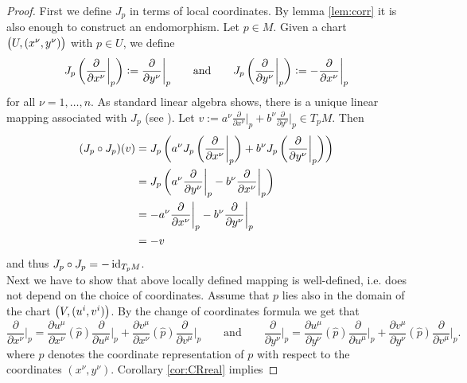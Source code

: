 \begin{proof}
First we define $J_p$ in terms of local coordinates. By lemma \ref{lem:corr} it is also enough to construct an endomorphism. Let $p \in M$. Given a chart $\del[1]{U,(x^\nu,y^\nu)}$ with $p \in U$, we define
\begin{equation*}
J_p\del[3]{\frac{\partial}{\partial x^\nu}\bigg\vert_p} := \frac{\partial}{\partial y^\nu}\bigg\vert_p \qquad \text{and} \qquad J_p\del[3]{\frac{\partial}{\partial y^\nu}\bigg\vert_p} := -\frac{\partial}{\partial x^\nu}\bigg\vert_p
\end{equation*}
\noindent for all $\nu = 1,\dots,n$. As standard linear algebra shows, there is a unique linear mapping associated with $J_p$ (see \cite[69]{hoffman:linear_algebra:1971}). Let $v := a^\nu\frac{\partial}{\partial x^\nu}\big\vert_p + b^\nu\frac{\partial}{\partial y^\nu}\big\vert_p \in T_p M$. Then
\begin{align*}
(J_p \circ J_p)(v) &=J_p\del[3]{a^\nu J_p\del[3]{\frac{\partial}{\partial x^\nu}\bigg\vert_p} + b^\nu J_p\del[3]{\frac{\partial}{\partial y^\nu}\bigg\vert_p}}\\
&= J_p\del[3]{a^\nu \frac{\partial}{\partial y^\nu}\bigg\vert_p - b^\nu \frac{\partial}{\partial x^\nu}\bigg\vert_p}\\
&= -a^\nu \frac{\partial}{\partial x^\nu}\bigg\vert_p - b^\nu \frac{\partial}{\partial y^\nu}\bigg\vert_p\\
&= -v
\end{align*}
\noindent and thus $J_p \circ J_p = -\operatorname{id}_{T_pM}$.\\
Next we have to show that above locally defined mapping is well-defined, i.e. does not depend on the choice of coordinates. Assume that $p$ lies also in the domain of the chart $\del[1]{V,(u^i,v^i)}$. By the change of coordinates formula \cite[64]{lee:smooth_manifolds:2013} we get that
\begin{equation*}
\frac{\partial}{\partial x^\nu}\bigg\vert_p = \frac{\partial u^\mu}{\partial x^\nu}(\widehat{p})\frac{\partial}{\partial u^\mu}\bigg\vert_p + \frac{\partial v^\mu}{\partial x^\nu}(\widehat{p})\frac{\partial}{\partial v^\mu}\bigg\vert_p \qquad \text{and} \qquad \frac{\partial}{\partial y^\nu}\bigg\vert_p = \frac{\partial u^\mu}{\partial y^\nu}(\widehat{p})\frac{\partial}{\partial u^\mu}\bigg\vert_p + \frac{\partial v^\mu}{\partial y^\nu}(\widehat{p})\frac{\partial}{\partial v^\mu}\bigg\vert_p. 
\end{equation*}
\noindent where $\widehat{p}$ denotes the coordinate representation of $p$ with respect to the coordinates $(x^\nu,y^\nu)$. Corollary \ref{cor:CRreal} implies

\end{proof}
